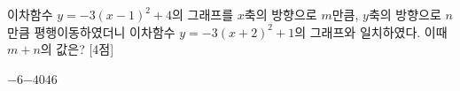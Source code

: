 이차함수 $y=-3(x-1)^2+4$의 그래프를 $x$축의 방향으로 $m$만큼, $y$축의 방향으로 $n$만큼 평행이동하였더니 이차함수 $y=-3(x+2)^2+1$의 그래프와 일치하였다. 이때 $m+n$의 값은? \mbox{[4점]}
\begin{choices32}{$-6$}{$-4$}{$0$}{$4$}{$6$}\end{choices32}
